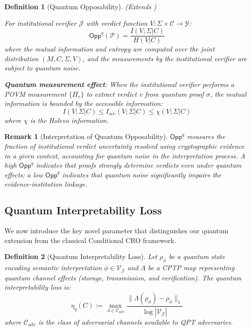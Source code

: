 \documentclass{ieeeaccess}
\newcommand{\Opp}{\mathsf{Opp}}
\newtheorem{definition}{Definition}[section]
\newtheorem{remark}{Remark}[section]
\begin{document}
\begin{definition}[Quantum Opposability]
\label{def:oppq}
\textit{(Extends \cite[Definition III-B.3]{Minka2026CRO})}

For institutional verifier $\mathcal{J}$ with verdict function $V: \Sigma \times \mathcal{C} \to \mathcal{Y}$:
\begin{equation}
    \Opp^q(\mathcal{P}) = \frac{I(V; \Sigma|C)}{H(V|C)}
\end{equation}
where the mutual information and entropy are computed over the joint distribution $(M, C, \Sigma, V)$, and the measurements by the institutional verifier are subject to quantum noise.

\textbf{Quantum measurement effect}: When the institutional verifier performs a POVM measurement $\{\Pi_v\}$ to extract verdict $v$ from quantum proof $\sigma$, the mutual information is bounded by the accessible information:
\begin{equation}
    I(V; \Sigma|C) \leq I_{\mathrm{acc}}(V; \Sigma|C) \leq χ(V; \Sigma|C)
\end{equation}
where $χ$ is the Holevo information.
\end{definition}

\begin{remark}[Interpretation of Quantum Opposability]
$\Opp^q$ measures the fraction of institutional verdict uncertainty resolved using cryptographic evidence in a given context, accounting for quantum noise in the interpretation process. A high $\Opp^q$ 
indicates that proofs strongly determine verdicts even under quantum effects; a low $\Opp^q$ indicates that quantum noise significantly impairs the evidence-institution linkage.
\end{remark}

\subsection{Quantum Interpretability Loss}

We now introduce the key novel parameter that distinguishes our quantum extension from the classical Conditional CRO framework.

\begin{definition}[Quantum Interpretability Loss]
\label{def:eta_q}
Let $\rho_\phi$ be a quantum state encoding semantic interpretation $\phi \in \mathcal{V}_\mathcal{J}$ and $\Lambda$ be a CPTP map representing quantum channel effects (storage, transmission, and verification). The quantum interpretability loss is:
\begin{equation}
    \eta_q(C) := \max_{\Lambda \in \mathcal{C}_{\text{adv}}} \frac{\|\Lambda(\rho_\phi) - \rho_\phi\|_1}{\log|\mathcal{V}_\mathcal{J}|}
\end{equation}
where $\mathcal{C}_{\text{adv}}$ is the class of adversarial channels available to QPT adversaries.
\end{definition}
\end{document}
